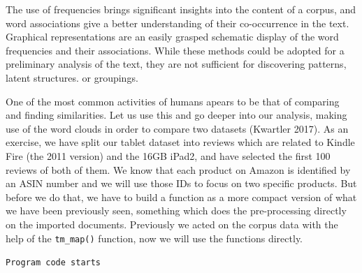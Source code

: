 The use of frequencies brings significant insights into the content of a
corpus, and word associations give a better understanding of their
co-occurrence in the text. Graphical representations are an easily grasped
schematic display of the word frequencies and their associations. While
these methods could be adopted for a preliminary analysis of the text,
they are not sufficient for discovering patterns, latent structures. or
groupings.

One of the most common activities of humans apears to be that of comparing and finding
similarities. Let us use this and go deeper into our analysis, making use of the word clouds in order
to compare two datasets (Kwartler 2017). As an exercise, we have split
our tablet dataset into reviews which are related to Kindle Fire (the
2011 version) and the 16GB iPad2, and have selected the first 100
reviews of both of them. We know that each product on Amazon is
identified by an ASIN number and we will use those IDs to focus on two
specific products. But before we do that, we have to build a function as a more
compact version of what we have been previously seen, something which does
the pre-processing directly on the imported documents. Previously we
acted on the corpus data with the help of the \texttt{tm\_map()}
function, now we will use the functions directly.

\texttt{Program\ code\ starts}


